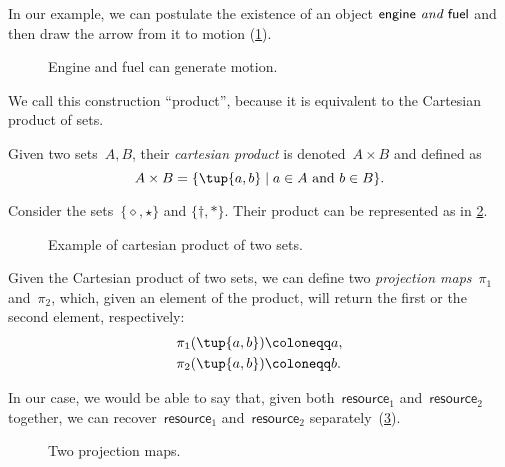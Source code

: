 In our example, we can postulate the existence of an object $\mathsf{engine} \emph{ and }\mathsf{fuel}$ and then draw the arrow from it to motion (\cref{fig:e13}).

\begin{figure}[h!]
    \centering
    \caption{Engine and fuel can generate motion. \label{fig:e13}}
\end{figure}

We call this construction ``product'', because it is equivalent to
the Cartesian product of sets.

\begin{definition}
\label{def:cartesian-product}
   Given two sets~$A,B$, their \emph{cartesian product} is denoted~$A\times  B$
   and defined as 
   \begin{equation}
       A\times  B=\{ \tup{a,b}\mid a\in A\text{ and } b\in B\}.
   \end{equation}
\end{definition}

\begin{example}
Consider the sets~$\{\diamond,\star\}$ and $\{\dagger, \ast\}$. Their product can be represented as in \cref{fig:cartesian-product}.
\begin{figure}[h!]
    \centering
    \caption{Example of cartesian product of two sets.\label{fig:cartesian-product}}
\end{figure}
\end{example}

Given the Cartesian product of two sets, we can define two \emph{projection maps}~$\pi_1$ and~$\pi_2$, which, given an element of the product, will return the first or the second element, respectively:
\begin{equation}
\begin{aligned}
    \pi_1(\tup{a,b}) &\coloneqq a,\\
    \pi_2(\tup{a,b}) &\coloneqq b.
\end{aligned}
\end{equation}

In our case, we would be able to say that, given both~$\mathsf{resource}_1$ and~$\mathsf{resource}_2$ together, we can recover~$\mathsf{resource}_1$ and~$\mathsf{resource}_2$ separately~(\cref{fig:resource-product}).

\begin{figure}[h!]
    \centering
    \caption{Two projection maps. \label{fig:resource-product}}
\end{figure}


